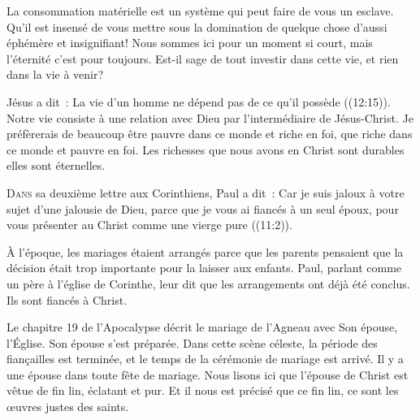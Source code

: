 
La consommation matérielle est un système qui peut faire de vous un esclave.
 Qu'il est insensé de vous mettre sous la domination de quelque chose
 d'aussi éphémère et insignifiant!
 Nous sommes ici pour un moment si court, mais l'éternité c'est pour toujours.
 Est-il sage de tout investir dans cette vie, et rien dans la vie à venir?

Jésus a dit~: 
 \og La vie d'un homme ne dépend pas de ce qu'il possède \fg{}
 ((12:15)).
 Notre vie consiste à une relation avec Dieu par l'intermédiaire
 de Jésus-Christ. Je préfèrerais de beaucoup être pauvre dans ce monde
 et riche en foi, que riche dans ce monde et pauvre en foi.
 Les richesses que nous avons en Christ sont durables
 \ocadr elles sont éternelles.

\dvrule






\lettrine{D}{ans} sa deuxième lettre aux Corinthiens,
 Paul a dit~: 
 \og Car je suis jaloux à votre sujet d'une jalousie de Dieu,
 parce que je vous ai fiancés à un seul époux,
 pour vous présenter au Christ comme une vierge pure \fg{}
 ((11:2)). 

À l'époque, les mariages étaient arrangés parce que les parents
 pensaient que la décision était trop importante pour la laisser aux enfants.
 Paul, parlant comme un père à l'église de Corinthe,
 leur dit que les arrangements ont déjà été conclus.
 Ils sont fiancés à Christ. 

Le chapitre 19 de l'Apocalypse décrit le mariage de l'Agneau avec Son épouse,
 l'Église. 
 \og Son épouse s'est préparée. \fg{} 
 Dans cette scène céleste, la période des fiançailles est terminée,
 et le temps de la cérémonie de mariage est arrivé.
 Il y a une épouse dans toute fête de mariage.
 Nous lisons ici que l'épouse de Christ est \og vêtue de fin lin,
 éclatant et pur. \fg{} 
 Et il nous est précisé que ce fin lin, ce sont
 \og les œuvres justes des saints. \fg{}  

